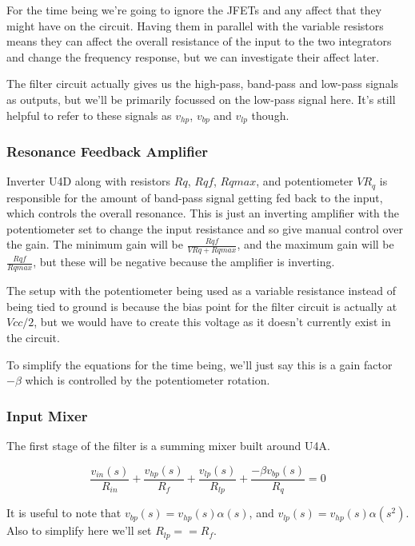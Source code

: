 \documentclass{article}
\begin{document}
For the time being we're going to ignore the JFETs and any affect that they might have on the circuit. Having them in parallel with the variable resistors means they can affect the overall resistance of the input to the two integrators and change the frequency response, but we can investigate their affect later.

The filter circuit actually gives us the high-pass, band-pass and low-pass signals as outputs, but we'll be primarily focussed on the low-pass signal here. It's still helpful to refer to these signals as $v_{hp}$, $v_{bp}$ and $v_{lp}$ though.

\subsubsection{Resonance Feedback Amplifier}

Inverter U4D along with resistors $Rq$, $Rqf$, $Rqmax$, and potentiometer $VR_q$ is responsible for the amount of band-pass signal getting fed back to the input, which controls the overall resonance. This is just an inverting amplifier with the potentiometer set to change the input resistance and so give manual control over the gain. The minimum gain will be $\frac{Rqf}{VRq + Rqmax}$, and the maximum gain will be $\frac{Rqf}{Rqmax}$, but these will be negative because the amplifier is inverting.

The setup with the potentiometer being used as a variable resistance instead of being tied to ground is because the bias point for the filter circuit is actually at $Vcc / 2$, but we would have to create this voltage as it doesn't currently exist in the circuit.

To simplify the equations for the time being, we'll just say this is a gain factor $-\beta$ which is controlled by the potentiometer rotation.

\subsubsection{Input Mixer}

The first stage of the filter is a summing mixer built around U4A.


\begin{equation}
  \frac{v_{in}(s)}{R_{in}} + \frac{v_{hp}(s)}{R_f} + \frac{v_{lp}(s)}{R_{lp}}  + \frac{{-\beta}v_{bp}(s)}{R_q} = 0
\end{equation}

It is useful to note that $v_{bp}(s) = v_{hp}(s)\alpha(s)$, and $v_{lp}(s) = v_{hp}(s)\alpha(s^2)$. Also to simplify here we'll set $R_{lp} == R_f$.
\end{document}
